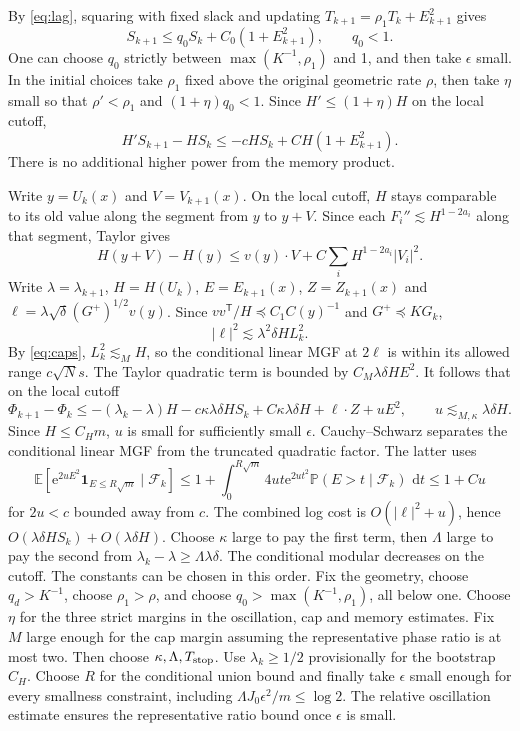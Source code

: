 \documentclass[11pt]{article}
\newcommand{\E}{\mathbb E}
\newcommand{\PP}{\mathbb P}
\newcommand{\ee}{\mathrm e}
\newcommand{\dd}{\,\mathrm d}
\begin{document}
By \eqref{eq:lag}, squaring with fixed slack and updating
\(T_{k+1}=\rho_1T_k+E_{k+1}^2\) gives
\begin{equation}\label{eq:memory}
 S_{k+1}\le q_0 S_k+C_0(1+E_{k+1}^2),\qquad q_0<1.
\end{equation}
One can choose \(q_0\) strictly between \(\max(K^{-1},\rho_1)\)
and 1, and then take \(\epsilon\) small. In the initial choices
take \(\rho_1\) fixed above the original geometric rate \(\rho\),
then take \(\eta\) small so that \(\rho'<\rho_1\) and
\((1+\eta)q_0<1\).
Since \(H'\le(1+\eta)H\) on the local cutoff,
\[
 H'S_{k+1}-HS_k\le-c H S_k+C H(1+E_{k+1}^2).
\]
There is no additional higher power from the memory product.

Write \(y=U_k(x)\) and \(V=V_{k+1}(x)\). On the local cutoff,
\(H\) stays comparable to its old value along the segment from
\(y\) to \(y+V\). Since each
\(F_i''\lesssim H^{1-2a_i}\) along that segment, Taylor gives
\[
 H(y+V)-H(y)\le v(y)\cdot V+C\sum_i H^{1-2a_i}|V_i|^2.
\]
Write \(\lambda=\lambda_{k+1}\), \(H=H(U_k)\),
\(E=E_{k+1}(x)\), \(Z=Z_{k+1}(x)\) and
\(\ell=\lambda\sqrt\delta (G^+)^{1/2}v(y)\).
Since \(vv^{\mathsf T}/H\preceq C_1 C(y)^{-1}\)
and \(G^+\preceq K G_k\),
\[
 |\ell|^2\lesssim \lambda^2\delta H L_k^2 .
\]
By \eqref{eq:caps}, \(L_k^2\lesssim_M H\), so the conditional
linear MGF at \(2\ell\) is within its allowed range
\(c\sqrt N s\). The Taylor quadratic term is bounded by
\(C_M\lambda\delta H E^2\).
It follows that on the local cutoff
\[
 \Phi_{k+1}-\Phi_k\le
   -(\lambda_k-\lambda)H-c\kappa\lambda\delta H S_k
   +C\kappa\lambda\delta H+\ell\cdot Z+uE^2,
 \qquad
 u\lesssim_{M,\kappa}\lambda\delta H .
\]
Since \(H\le C_Hm\), \(u\) is small for sufficiently small
\(\epsilon\). Cauchy--Schwarz separates the conditional linear
MGF from the truncated quadratic factor. The latter uses
\[
 \E[\ee^{2u E^2}\mathbf{1}_{E\le R\sqrt m}\mid\mathcal F_k]
 \le 1+\int_0^{R\sqrt m}4ut\ee^{2ut^2}
                 \PP(E>t\mid\mathcal F_k)\,\dd t
 \le 1+Cu
\]
for \(2u<c\) bounded away from \(c\). The combined log cost is
\(O(|\ell|^2+u)\), hence
\(O(\lambda\delta H S_k)+O(\lambda\delta H)\).
Choose \(\kappa\) large to pay the first term, then \(\Lambda\)
large to pay the second from \(\lambda_k-\lambda\ge
\Lambda\lambda\delta\). The conditional modular decreases on the
cutoff. The constants can be chosen in this order. Fix the geometry,
choose \(q_d>K^{-1}\), choose \(\rho_1>\rho\), and choose
\(q_0>\max(K^{-1},\rho_1)\), all below one. Choose \(\eta\)
for the three strict margins in the oscillation, cap and
memory estimates. Fix \(M\) large enough for the cap margin
assuming the representative phase ratio is at most two.
Then choose \(\kappa,\Lambda,T_{\rm stop}\).
Use \(\lambda_k\ge1/2\) provisionally for the bootstrap \(C_H\).
Choose \(R\) for the conditional union bound and finally take
\(\epsilon\) small enough for every smallness constraint, including
\(\Lambda J_0\epsilon^2/m\le\log 2\).
The relative oscillation estimate ensures the representative
ratio bound once \(\epsilon\) is small.
\end{document}

